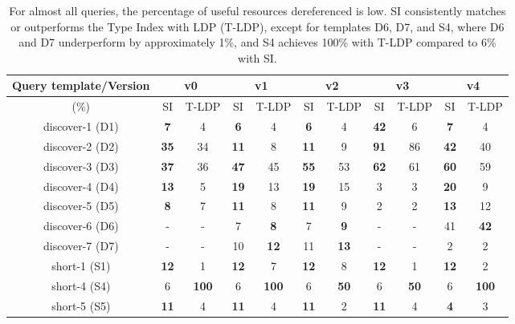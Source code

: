 \begin{table}[htbp]
	\begin{center}
		\begin{tabular}{|c|c|c|c|c|c|c|c|c|c|c|}
			\hline
            \multicolumn{1}{|c}{Query template/Version} & \multicolumn{2}{|c|}{v0} & \multicolumn{2}{|c|}{v1} & \multicolumn{2}{|c|}{v2} & \multicolumn{2}{|c|}{v3} & \multicolumn{2}{|c|}{v4} \\
			\hline
            (\%) & SI  & T-LDP & SI & T-LDP & SI & T-LDP& SI & T-LDP & SI & T-LDP \\
            \hline
			discover-1 (D1) & \textbf{7} & 4 & \textbf{6} & 4 & \textbf{6} & 4 & \textbf{42} & 6 & \textbf{7} & 4 \\
            \hline
            discover-2 (D2) & \textbf{35} & 34 & \textbf{11} & 8 & \textbf{11} & 9 & \textbf{91} & 86 & \textbf{42} & 40 \\
			\hline
            discover-3 (D3) & \textbf{37} & 36 & \textbf{47} & 45 & \textbf{55} & 53 & \textbf{62} & 61 & \textbf{60} & 59 \\
			\hline
            discover-4 (D4) & \textbf{13} & 5 & \textbf{19} & 13 & \textbf{19} & 15 & 3 & 3 & \textbf{20} & 9 \\
			\hline
            discover-5 (D5) & \textbf{8} & 7 & \textbf{11} & 8 & \textbf{11} & 9 & 2 & 2 & \textbf{13} & 12 \\
			\hline
            discover-6 (D6) & - & - & 7 & \textbf{8} & 7 & \textbf{9} & - & - & 41 & \textbf{42} \\
			\hline
            discover-7 (D7) & - & - & 10 & \textbf{12} & 11 & \textbf{13} & - & - & 2 & 2 \\
			\hline
            short-1 (S1) & \textbf{12} & 1 & \textbf{12} & 7 & \textbf{12} & 8 & \textbf{12} & 1 & \textbf{12} & 2 \\
			\hline
            short-4 (S4) & 6 & \textbf{100} & 6 & \textbf{100} & 6 & \textbf{50} & 6 & \textbf{50} & 6 & \textbf{100} \\
			\hline
            short-5 (S5) & \textbf{11} & 4 & \textbf{11} & 4 & \textbf{11} & 2 & \textbf{11} & 4 & \textbf{4} & 3 \\
			\hline
		\end{tabular}
	\end{center}
	\caption{
        For almost all queries, the percentage of useful resources dereferenced is low. 
		SI consistently matches or outperforms the Type Index with LDP (T-LDP), except for templates D6, D7, and S4, where D6 and D7 underperform by approximately 1\%, and S4 achieves 100\% with T-LDP compared to 6\% with SI.
		}
	\label{tab:ratioUsefulResources}
\end{table}
